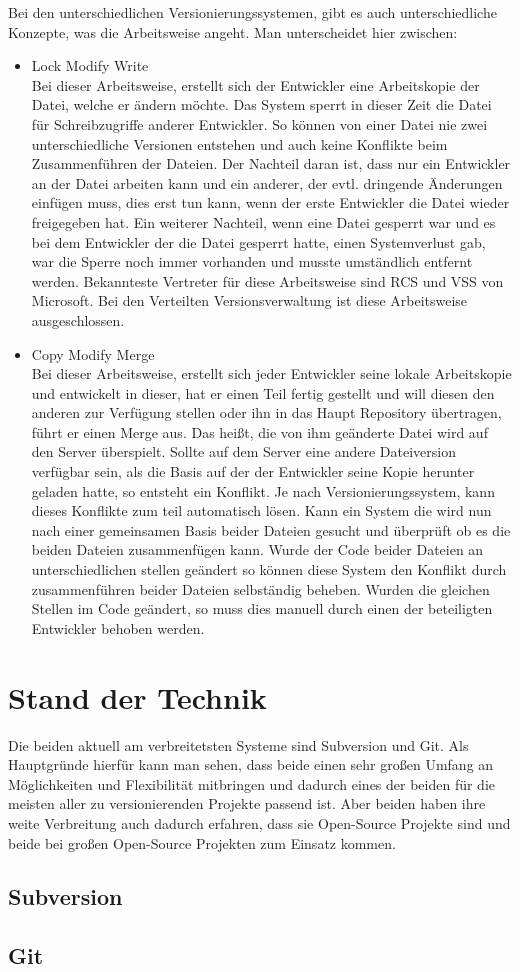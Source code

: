 Bei den unterschiedlichen Versionierungssystemen, gibt es auch unterschiedliche Konzepte, was die Arbeitsweise angeht. Man unterscheidet hier zwischen:
\begin{itemize}
\item Lock Modify Write\\
Bei dieser Arbeitsweise, erstellt sich der Entwickler eine Arbeitskopie der Datei, welche er ändern möchte. Das System sperrt in dieser Zeit die Datei für Schreibzugriffe anderer Entwickler. So können von einer Datei nie zwei unterschiedliche Versionen entstehen und auch keine Konflikte beim Zusammenführen der Dateien. Der Nachteil daran ist, dass nur ein Entwickler an der Datei arbeiten kann und ein anderer, der evtl. dringende Änderungen einfügen muss, dies erst tun kann, wenn der erste Entwickler die Datei wieder freigegeben hat. Ein weiterer Nachteil, wenn eine Datei gesperrt war und es bei dem Entwickler der die Datei gesperrt hatte, einen Systemverlust gab, war die Sperre noch immer vorhanden und musste umständlich entfernt werden. Bekannteste Vertreter für diese Arbeitsweise sind RCS und VSS von Microsoft. Bei den Verteilten Versionsverwaltung ist diese Arbeitsweise ausgeschlossen.

\item Copy Modify Merge\\
Bei dieser Arbeitsweise, erstellt sich jeder Entwickler seine lokale Arbeitskopie und entwickelt in dieser, hat er einen Teil fertig gestellt und will diesen den anderen zur Verfügung stellen oder ihn in das Haupt Repository übertragen, führt er einen Merge aus. Das heißt, die von ihm geänderte Datei wird auf den Server überspielt. 
Sollte auf dem Server eine andere Dateiversion verfügbar sein, als die Basis auf der der Entwickler seine Kopie herunter geladen hatte, so entsteht ein Konflikt. 
Je nach Versionierungssystem, kann dieses Konflikte zum teil automatisch lösen. 
Kann ein System die wird nun nach einer gemeinsamen Basis beider Dateien gesucht und überprüft ob es die beiden Dateien zusammenfügen kann. Wurde der Code beider Dateien an unterschiedlichen stellen geändert so können diese System den Konflikt durch zusammenführen beider Dateien selbständig beheben. Wurden die gleichen Stellen im Code geändert, so muss dies manuell durch einen der beteiligten Entwickler behoben werden. 
\end{itemize}

\section{Stand der Technik}
Die beiden aktuell am verbreitetsten Systeme sind Subversion und Git. Als Hauptgründe hierfür kann man sehen, dass beide einen sehr großen Umfang an Möglichkeiten und Flexibilität mitbringen und dadurch eines der beiden für die meisten aller zu versionierenden Projekte passend ist. Aber beiden haben ihre weite Verbreitung auch dadurch erfahren, dass sie Open-Source Projekte sind und beide bei großen Open-Source Projekten zum Einsatz kommen.
\subsection{Subversion}


\subsection{Git}

